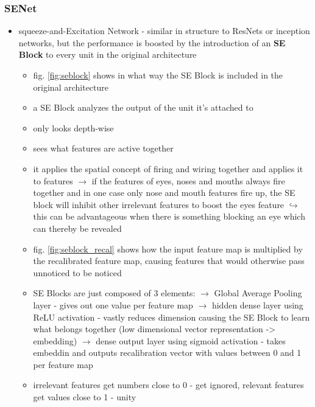 \documentclass[12pt,a4paper]{article}
\begin{document}
\subsubsection{SENet} %
\label{ssub:senet}
\begin{itemize}
  \item squeeze-and-Excitation Network - similar in structure to ResNets or inception networks, but the performance is boosted by the introduction of an \textbf{SE Block} to every unit in the original architecture
  \begin{itemize}
    \item fig. \ref{fig:seblock} shows in what way the SE Block is included in the original architecture
    \item a SE Block analyzes the output of the unit it's attached to
    \item only looks depth-wise
    \item sees what features are active together
    \item it applies the spatial concept of firing and wiring together and applies it to features
    \newline \indent $\longrightarrow$ if the features of eyes, noses and mouths always fire together and in one case only nose and mouth features fire up, the SE block will inhibit other irrelevant features to boost the eyes feature
    \newline \indent $\hookrightarrow$ this can be advantageous when there is something blocking an eye which can thereby be revealed
    \item fig. \ref{fig:seblock_recal} shows how the input feature map is multiplied by the recalibrated feature map, causing features that would otherwise pass unnoticed to be noticed
    \item SE Blocks are just composed of 3 elements:
    \newline \indent $\longrightarrow$ Global Average Pooling layer - gives out one value per feature map
    \newline \indent $\longrightarrow$ hidden dense layer using ReLU activation - vastly reduces dimension causing the SE Block to learn what belongs together (low dimensional vector representation -> embedding)
    \newline \indent $\longrightarrow$ dense output layer using sigmoid activation - takes embeddin and outputs recalibration vector with values between 0 and 1 per feature map
    \item irrelevant features get numbers close to 0 - get ignored, relevant features get values close to 1 - unity
  \end{itemize}
\end{itemize}
\end{document}

